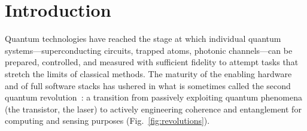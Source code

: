\chapter{Introduction}
\label{ch:introduction}

Quantum technologies have reached the stage at which individual quantum
systems---superconducting circuits, trapped atoms, photonic channels---can be
prepared, controlled, and measured with sufficient fidelity to attempt tasks
that stretch the limits of classical methods.  The maturity of the enabling
hardware and of full software stacks has ushered in what is sometimes called
the second quantum revolution~\cite{DowlingMilburn2003, Deutsch2020}: a
transition from passively exploiting quantum phenomena (the transistor, the
laser) to actively engineering coherence and entanglement for computing and
sensing purposes (Fig.~\ref{fig:revolutions}).

